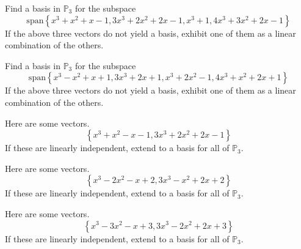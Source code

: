 \documentclass{ximera}
\begin{document}
\begin{problem}\label{prb:10.43} Find a basis in $\mathbb{P}_{3}$ for the subspace
\begin{equation*}
\mbox{span}\left\{
x^{3}+x^{2}+x-1,3x^{3}+2x^{2}+2x-1,x^{3}+1,4x^{3}+3x^{2}+2x-1\right\}
\end{equation*}
If the above three vectors do not yield a basis, exhibit one
of them as a linear combination of the others.
\end{problem}


\begin{problem}\label{prb:10.44} Find a basis in $\mathbb{P}_{3}$ for the subspace
\begin{equation*}
\mbox{span}\left\{
x^{3}-x^{2}+x+1,3x^{3}+2x+1,x^{3}+2x^{2}-1,4x^{3}+x^{2}+2x+1\right\}
\end{equation*}
If the above three vectors do not yield a basis, exhibit one
of them as a linear combination of the others.
\end{problem}


\begin{problem}\label{prb:10.45} Here are some vectors.
\begin{equation*}
\left\{ x^{3}+x^{2}-x-1,3x^{3}+2x^{2}+2x-1\right\}
\end{equation*}
If these are linearly independent, extend to a basis for all of $\mathbb{P}
_{3}$.
\end{problem}


\begin{problem}\label{prb:10.46} Here are some vectors.
\begin{equation*}
\left\{ x^{3}-2x^{2}-x+2,3x^{3}-x^{2}+2x+2\right\}
\end{equation*}
If these are linearly independent, extend to a basis for all of $\mathbb{P}
_{3}$.
\end{problem}


\begin{problem}\label{prb:10.47} Here are some vectors.
\begin{equation*}
\left\{ x^{3}-3x^{2}-x+3,3x^{3}-2x^{2}+2x+3\right\}
\end{equation*}
If these are linearly independent, extend to a basis for all of $\mathbb{P}
_{3}$.
\end{problem}
\end{document}
